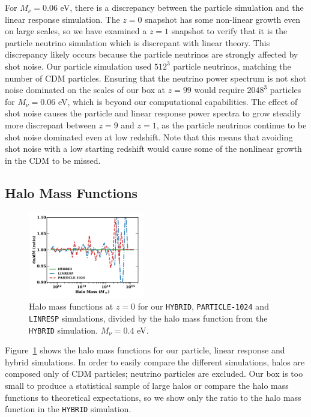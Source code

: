 \documentclass[useAMS, usenatbib]{mnras}
\begin{document}
For $M_\nu = 0.06$ eV, there is a discrepancy between the particle simulation and the linear response simulation. The $z=0$ snapshot has some non-linear growth even on large scales, so we have examined a $z=1$ snapshot to verify that it is the particle neutrino simulation which is discrepant with linear theory. This discrepancy likely occurs because the particle neutrinos are strongly affected by shot noise. Our particle simulation used $512^3$ particle neutrinos, matching the number of CDM particles. Ensuring that the neutrino power spectrum is not shot noise dominated on the scales of our box at $z=99$ would require $2048^3$ particles for $M_\nu = 0.06$ eV, which is beyond our computational capabilities. The effect of shot noise causes the particle and linear response power spectra to grow steadily more discrepant between $z=9$ and $z=1$, as the particle neutrinos continue to be shot noise dominated even at low redshift. Note that this means that avoiding shot noise with a low starting redshift would cause some of the nonlinear growth in the CDM to be missed.

\subsection{Halo Mass Functions}
\label{sec:halomass}

\begin{figure}
  \includegraphics[width=0.45\textwidth]{nuplots/hmf-1.pdf}
\caption{Halo mass functions at $z=0$ for our \texttt{HYBRID}, \texttt{PARTICLE-1024} and \texttt{LINRESP} simulations, divided by the halo mass function from the \texttt{HYBRID} simulation. $M_\nu = 0.4$ eV.}
  \label{fig:halomass}
\end{figure}

Figure~\ref{fig:halomass} shows the halo mass functions for our particle, linear response and hybrid simulations. In order to easily compare the different simulations, halos are composed only of CDM particles; neutrino particles are excluded. Our box is too small to produce a statistical sample of large halos or compare the halo mass functions to theoretical expectations, so we show only the ratio to the halo mass function in the \texttt{HYBRID} simulation.
\end{document}
